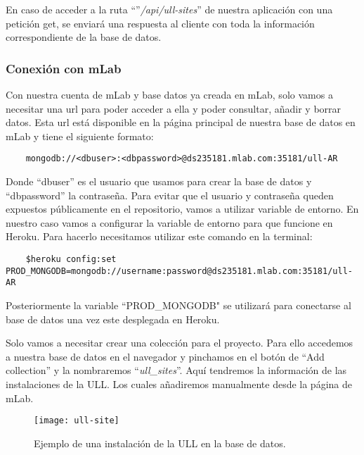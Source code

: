  
En caso de acceder a la ruta ``''\textit{/api/ull-sites}'' de nuestra aplicación con una petición get, se enviará una respuesta al cliente con toda la información correspondiente de la base de datos.

\subsubsection{Conexión con mLab}

Con nuestra cuenta de mLab y base datos ya creada en mLab, solo vamos a necesitar una url para poder acceder a ella y poder consultar, añadir y borrar datos. Esta url está disponible en la página principal de nuestra base de datos en mLab y tiene el siguiente formato:

\begin{lstlisting}
    mongodb://<dbuser>:<dbpassword>@ds235181.mlab.com:35181/ull-AR
\end{lstlisting}

Donde ``dbuser'' es el usuario que usamos para crear la base de datos y ``dbpassword'' la contraseña. Para evitar que el usuario y contraseña queden expuestos públicamente en el repositorio, vamos a utilizar variable de entorno. En nuestro caso vamos a configurar la variable de entorno para que funcione en Heroku. Para hacerlo necesitamos utilizar este comando en la terminal:

\begin{lstlisting}
    $heroku config:set PROD_MONGODB=mongodb://username:password@ds235181.mlab.com:35181/ull-AR
\end{lstlisting}

Posteriormente la variable ``PROD\_MONGODB" se utilizará para conectarse al base de datos una vez este desplegada en Heroku.

Solo vamos a necesitar crear una colección para el proyecto. Para ello accedemos a nuestra base de datos en el navegador y pinchamos en el botón de ``Add collection'' y la nombraremos ``\textit{ull\_sites}''. Aquí tendremos la información de las instalaciones de la ULL. Los cuales añadiremos manualmente desde la página de mLab.

\begin{figure}[h] 
    \centering
    \texttt{[image: ull-site]}
    \caption{Ejemplo de una instalación de la ULL en la base de datos.}
    \label{fig:ull-site}
\end{figure}

